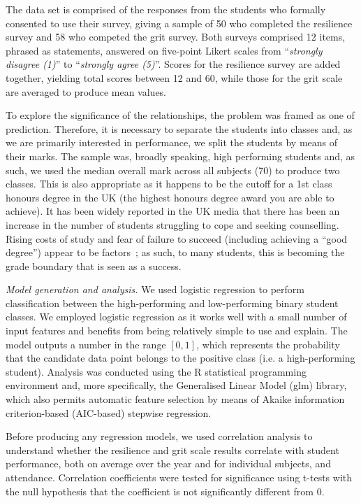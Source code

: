 \documentclass[sigconf]{acmart}
\begin{document}
The data set is comprised of the responses from the students who formally consented to use their survey, giving a sample of 50 who completed the resilience survey and 58 who competed the grit survey. Both surveys comprised 12 items, phrased as statements, answered on five-point Likert scales from ``{\emph{strongly disagree (1)}}'' to ``{\emph{strongly agree (5)}}''. Scores for the resilience survey are added together, yielding total scores between 12 and 60, while those for the grit scale are averaged to produce mean values.

To explore the significance of the relationships, the problem was framed as one of prediction. Therefore, it is necessary to separate the students into classes and, as we are primarily interested in performance, we split the students by means of their marks. The sample was, broadly speaking, high performing students and, as such, we used the median overall mark across all subjects (70) to produce two classes. This is also appropriate as it happens to be the cutoff for a 1st class honours degree in the UK (the highest honours degree award you are able to achieve). It has been widely reported in the UK media that there has been an increase in the number of students struggling to cope and seeking counselling. Rising costs of study and fear of failure to succeed (including achieving a ``good degree'') appear to be factors~\cite{BBC}; as such, to many students, this is becoming the grade boundary that is seen as a success.

{\em Model generation and analysis.}
We used logistic regression to perform classification between the high-performing and low-performing binary student classes. We employed logistic regression as it works well with a small number of input features and benefits from being relatively simple to use and explain. The model outputs a number in the range $[0,1]$, which represents the probability that the candidate data point belongs to the positive class (i.e. a high-performing student). Analysis was conducted using the R statistical programming environment and, more specifically, the Generalised Linear Model (glm) library, which also permits automatic feature selection by means of Akaike information criterion-based (AIC-based) stepwise regression.

Before producing any regression models, we used correlation analysis to understand whether the resilience and grit scale results correlate with student performance, both on average over the year and for individual subjects, and attendance. Correlation coefficients were tested for significance using t-tests with the null hypothesis that the coefficient is not significantly different from 0. 
\end{document}
